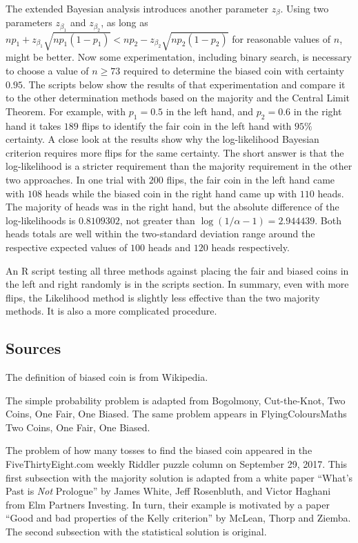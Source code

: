 \documentclass[12pt]{article}
\begin{document}
The extended Bayesian analysis introduces another parameter \( z_{\beta}
\).  Using two parameters \( z_{\beta_1} \) and \( z_{\beta_2} \), as
long as \( np_1+z_{\beta_1}\sqrt{np_1(1-p_1)} < np_2-z_{\beta_2}\sqrt{np_2
(1-p_2)} \) for reasonable values of \( n \), might be better. Now some
experimentation, including binary search, is necessary to choose a value
of \( n \ge 73 \) required to determine the biased coin with certainty \(
0.95 \).  The scripts below show the results of that experimentation and
compare it to the other determination methods based on the majority and
the Central Limit Theorem.  For example, with \( p_1 = 0.5 \) in the
left hand, and \( p_2 = 0.6 \) in the right hand it takes \( 189 \)
flips to identify the fair coin in the left hand with \( 95\% \)
certainty.  A close look at the results show why the log-likelihood
Bayesian criterion requires more flips for the same certainty.  The
short answer is that the log-likelihood is a stricter requirement than
the majority requirement in the other two approaches.  In one trial with
\( 200 \) flips, the fair coin in the left hand came with \( 108 \)
heads while the biased coin in the right hand came up with \( 110 \)
heads.  The majority of heads was in the right hand, but the absolute
difference of the log-likelihoods is \( 0.8109302 \), not greater than \(
\log(1/\alpha-1) = 2.944439 \).  Both heads totals are well within the
two-standard deviation range around the respective expected values of \(
100 \) heads and \( 120 \) heads respectively.

An R script testing all three methods against placing the fair and
biased coins in the left and right randomly is in the scripts section.
In summary, even with more flips, the Likelihood method is slightly less
effective than the two majority methods.  It is also a more complicated
procedure.

\subsection*{Sources}

The definition of biased coin is from Wikipedia.

The simple probability problem is adapted from 
{Bogolmony, Cut-the-Knot, Two Coins, One Fair, One Biased}.  The same
problem appears in 
{FlyingColoursMaths Two Coins, One Fair, One Biased}.

The problem of how many tosses to find the biased coin appeared in the
FiveThirtyEight.com weekly Riddler puzzle column on September 29, 2017.
This first subsection with the majority solution is adapted from a white
paper ``What's Past is \emph{Not} Prologue'' by James White, Jeff
Rosenbluth, and Victor Haghani from Elm Partners Investing.  In turn,
their example is motivated by a paper ``Good and bad properties of the
Kelly criterion'' by McLean, Thorp and Ziemba.  The second subsection
with the statistical solution is original.
\end{document}
